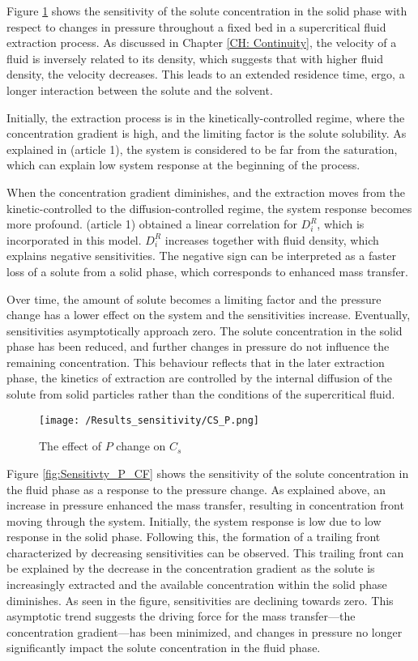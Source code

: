 \documentclass[../Article_Sensitivity_Analsysis.tex]{subfiles}
\begin{document}
	Figure \ref{fig:Sensitivty_P_CS} shows the sensitivity of the solute concentration in the solid phase with respect to changes in pressure throughout a fixed bed in a supercritical fluid extraction process. As discussed in Chapter \ref{CH: Continuity}, the velocity of a fluid is inversely related to its density, which suggests that with higher fluid density, the velocity decreases. This leads to an extended residence time, ergo, a longer interaction between the solute and the solvent.
	
	Initially, the extraction process is in the kinetically-controlled regime, where the concentration gradient is high, and the limiting factor is the solute solubility. As explained in ({\color{red}article 1}), the system is considered to be far from the saturation, which can explain low system response at the beginning of the process. 
	
	When the concentration gradient diminishes, and the extraction moves from the kinetic-controlled to the diffusion-controlled regime, the system response becomes more profound. ({\color{red}article 1}) obtained a linear correlation for $D_i^R$, which is incorporated in this model. $D_i^R$ increases together with fluid density, which explains negative sensitivities. The negative sign can be interpreted as a faster loss of a solute from a solid phase, which corresponds to enhanced mass transfer. 
	
	Over time, the amount of solute becomes a limiting factor and the pressure change has a lower effect on the system and the sensitivities increase. Eventually, sensitivities asymptotically approach zero. The solute concentration in the solid phase has been reduced, and further changes in pressure do not influence the remaining concentration. This behaviour reflects that in the later extraction phase, the kinetics of extraction are controlled by the internal diffusion of the solute from solid particles rather than the conditions of the supercritical fluid.

	\begin{figure}[h!]
		\centering
		\texttt{[image: /Results\_sensitivity/CS\_P.png]}
		\caption{The effect of $P$ change on $C_s$}
		\label{fig:Sensitivty_P_CS}
	\end{figure}
	
	Figure \ref{fig:Sensitivty_P_CF} shows the sensitivity of the solute concentration in the fluid phase as a response to the pressure change. As explained above, an increase in pressure enhanced the mass transfer, resulting in concentration front moving through the system. Initially, the system response is low due to low response in the solid phase. 
	Following this, the formation of a trailing front characterized by decreasing sensitivities can be observed. This trailing front can be explained by the decrease in the concentration gradient as the solute is increasingly extracted and the available concentration within the solid phase diminishes. As seen in the figure, sensitivities are declining towards zero. This asymptotic trend suggests the driving force for the mass transfer—the concentration gradient—has been minimized, and changes in pressure no longer significantly impact the solute concentration in the fluid phase.
	
\end{document}
